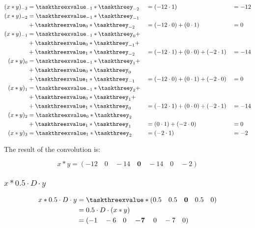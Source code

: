 \documentclass[a4paper]{article}
\theoremstyle{break}
\theoremstyle{break}
\begin{document}
\begin{alignat*}{3}
  (x \ast y)_{-3} &= \taskthreexvalue_{-1} \ast \taskthreey_{-2} &&= (-12 \cdot 1) &&= -12 \\
  (x \ast y)_{-2} &= \taskthreexvalue_{-1} \ast \taskthreey_{-1} &&&&\\
    &+ \taskthreexvalue_{0} \ast \taskthreey_{-2} &&= (-12 \cdot 0) + (0 \cdot 1) &&= 0 \\
  (x \ast y)_{-1} &= \taskthreexvalue_{-1} \ast \taskthreey_{0} + \\ 
    &+ \taskthreexvalue_{0} \ast \taskthreey_{-1} + &&&& \\
    &+ \taskthreexvalue_{1} \ast \taskthreey_{-2} &&= (-12 \cdot 1) + (0 \cdot 0) + (-2 \cdot 1) &&= -14 \\
  (x \ast y)_{0} &= \taskthreexvalue_{-1} \ast \taskthreey_{1} + &&&&\\
    &+ \taskthreexvalue_{0} \ast \taskthreey_{0} &&&&\\
    &+ \taskthreexvalue_{1} \ast \taskthreey_{-1} &&= (-12 \cdot 0) + (0 \cdot 1) + (-2 \cdot 0) &&= 0 \\
  (x \ast y)_{1} &= \taskthreexvalue_{-1} \ast \taskthreey_{2} + \\ 
    &+ \taskthreexvalue_{0} \ast \taskthreey_{1} + &&&& \\
    &+ \taskthreexvalue_{1} \ast \taskthreey_{0} &&= (-12 \cdot 1) + (0 \cdot 0) + (-2 \cdot 1) &&= -14 \\
  (x \ast y)_{2} &= \taskthreexvalue_{0} \ast \taskthreey_{2} &&&&\\
    &+ \taskthreexvalue_{1} \ast \taskthreey_{1} &&= (0 \cdot 1) + (-2 \cdot 0) &&= 0 \\
  (x \ast y)_{3} &= \taskthreexvalue_{1} \ast \taskthreey_{2} &&= (-2 \cdot 1) &&= -2 \\
\end{alignat*}

The result of the convolution is:

\begin{equation*}
  x \ast y = \left( -12 \quad 0 \quad -14 \quad \boldsymbol{0} \quad -14 \quad 0 \quad -2 \right)
\end{equation*}

\subsubsection*{$x \ast 0.5 \cdot D \cdot y$}

\begin{equation*}
  \begin{split}
    x \ast 0.5 \cdot D \cdot y &= \taskthreexvalue \ast \left( 0.5 \quad 0.5 \quad \boldsymbol{0} \quad 0.5 \quad 0 \right) \\
      &= 0.5 \cdot D \cdot (x \ast y) \\
      &= \left( -1 \quad -6 \quad 0 \quad \boldsymbol{-7} \quad 0 \quad -7 \quad 0 \right)
  \end{split}
\end{equation*}
\end{document}
